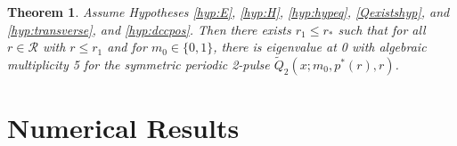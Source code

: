 \documentclass[10pt,reqno]{amsart}
\theoremstyle{plain}
\newtheorem{theorem}{Theorem}
\theoremstyle{definition}
\theoremstyle{remark}
\numberwithin{theorem}{section}
\numberwithin{equation}{section}
\begin{document}
\begin{theorem}\label{theorem:2peigssym}
Assume Hypotheses \ref{hyp:E}, \ref{hyp:H}, \ref{hyp:hypeq}, \ref{Qexistshyp}, and \ref{hyp:transverse}, and \ref{hyp:dccpos}. Then there exists $r_1 \leq r_*$ such that for all $r \in \mathcal{R}$ with $r \leq r_1$ and for $m_0 \in \{0, 1\}$, there is eigenvalue at 0 with algebraic multiplicity 5 for the symmetric periodic 2-pulse $\tilde{Q}_2(x; m_0, p^*(r), r)$.
\end{theorem}

\section{Numerical Results}\label{sec:numerics}

\end{document}
